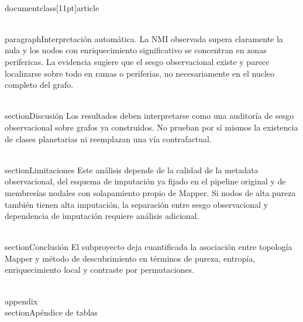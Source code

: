 \\documentclass[11pt]{article}
\begin{document}
\\paragraph{Interpretaci\'on autom\'atica.} La NMI observada supera claramente la nula y los nodos con enriquecimiento significativo se concentran en zonas perifericas. La evidencia sugiere que el sesgo observacional existe y parece localizarse sobre todo en ramas o periferias, no necesariamente en el nucleo completo del grafo.

\\section{Discusi\'on}
Los resultados deben interpretarse como una auditor\'ia de sesgo observacional sobre grafos ya construidos. No prueban por s\'i mismos la existencia de clases planetarias ni reemplazan una v\'ia contrafactual.

\\section{Limitaciones}
Este an\'alisis depende de la calidad de la metadata observacional, del esquema de imputaci\'on ya fijado en el pipeline original y de membres\'ias nodales con solapamiento propio de Mapper. Si nodos de alta pureza tambi\'en tienen alta imputaci\'on, la separaci\'on entre sesgo observacional y dependencia de imputaci\'on requiere an\'alisis adicional.

\\section{Conclusi\'on}
El subproyecto deja cuantificada la asociaci\'on entre topolog\'ia Mapper y m\'etodo de descubrimiento en t\'erminos de pureza, entrop\'ia, enriquecimiento local y contraste por permutaciones.

\\appendix
\\section{Ap\'endice de tablas}
\
\
\

\
\end{document}
